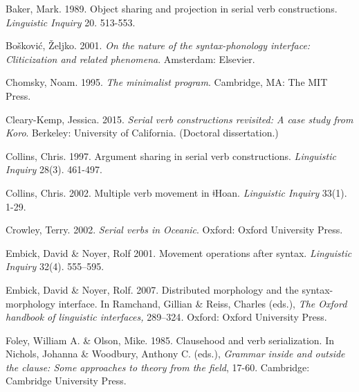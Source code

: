 \documentclass[output=paper]{langsci/langscibook}
\begin{document}
\begin{styleNoSpacing}
Baker, Mark. 1989. Object sharing and projection in serial verb constructions. \textit{Linguistic Inquiry} 20. 513-553.
\end{styleNoSpacing}

\begin{styleNoSpacing}
Bošković, Željko. 2001. \textit{On the nature of the syntax-phonology interface: Cliticization and related phenomena}. Amsterdam: Elsevier.
\end{styleNoSpacing}

\begin{styleNoSpacing}
Chomsky, Noam. 1995. \textit{The minimalist program}. Cambridge, MA: The MIT Press.
\end{styleNoSpacing}

Cleary-Kemp, Jessica. 2015. \textit{Serial verb constructions revisited: A case study from Koro}. Berkeley: University of California. (Doctoral dissertation.) 

Collins, Chris. 1997. Argument sharing in serial verb constructions. \textit{Linguistic Inquiry} 28(3). 461-497.

\begin{styleNoSpacing}
Collins, Chris. 2002. Multiple verb movement in ǂHoan. \textit{Linguistic Inquiry} 33(1). 1-29.
\end{styleNoSpacing}

\begin{styleNoSpacing}
Crowley, Terry. 2002. \textit{Serial verbs in Oceanic}. Oxford: Oxford University Press.
\end{styleNoSpacing}

\begin{styleNoSpacing}
Embick, David \& Noyer, Rolf 2001. Movement operations after syntax. \textit{Linguistic Inquiry} 32(4). 555–595.
\end{styleNoSpacing}

\begin{styleNoSpacing}
Embick, David \& Noyer, Rolf. 2007. Distributed morphology and the syntax-morphology interface. In Ramchand, Gillian \& Reiss, Charles (eds.), \textit{The Oxford handbook of linguistic interfaces, }289–324\textit{. }Oxford: Oxford University Press.
\end{styleNoSpacing}

\begin{styleNoSpacing}
Foley, William A. \& Olson, Mike. 1985. Clausehood and verb serialization. In Nichols, Johanna \& Woodbury, Anthony C. (eds.), \textit{Grammar inside and outside the clause: Some approaches to theory from the field}, 17-60. Cambridge: Cambridge University Press. 
\end{styleNoSpacing}
\end{document}
